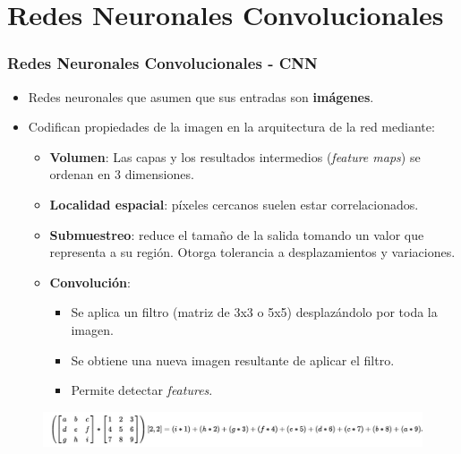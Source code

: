 \documentclass[10pt,center]{beamer}
\begin{document}
\section{Redes Neuronales Convolucionales}
\begin{frame}
  \frametitle{Redes Neuronales Convolucionales - CNN}
    \begin{itemize}
      \item Redes neuronales que asumen que sus entradas son \textbf{imágenes}.
      \item Codifican propiedades de la imagen en la arquitectura de la red mediante:
      \begin{itemize}
	\item \textbf{Volumen}: Las capas y los resultados intermedios (\textit{feature maps}) se ordenan en 3 dimensiones.
	\item \textbf{Localidad espacial}: píxeles cercanos suelen estar correlacionados.
	\item \textbf{Submuestreo}: reduce el tamaño de la salida tomando un valor que representa a su región. 
	Otorga tolerancia a desplazamientos y variaciones.
	\item \textbf{Convolución}:
	  \begin{itemize}
	    \item Se aplica un filtro (matriz de 3x3 o 5x5) desplazándolo por toda la imagen.
	    \item Se obtiene una nueva imagen resultante de aplicar el filtro.
	    \item Permite detectar \textit{features}. 
	  \end{itemize}
      \end{itemize}
    \end{itemize}
    \begin{figure}[h]
    \captionsetup[subfigure]{labelformat=empty}
      \begin{center}
      \includegraphics[width=\textwidth]{./img/convolution_wiki.jpg}
      \end{center}
    \end{figure}
\end{frame}
  
\end{document}
